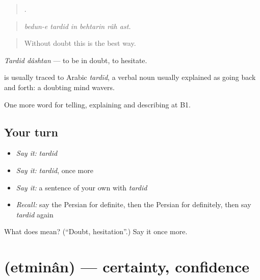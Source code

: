 \begin{quote}
     .
\end{quote}

\begin{quote}
\emph{bedun-e tardid in behtarin râh ast.}
\end{quote}

\begin{quote}
Without doubt this is the best way.
\end{quote}

\emph{Tardid dâshtan} — to be in doubt, to hesitate.

\begin{cousinweb}
\textbf{} is usually traced to Arabic \emph{tardīd}, a verbal noun usually explained as going back and forth: a doubting mind wavers.
\end{cousinweb}

\begin{grammarlens}[title={What you've built}]
One more word for telling, explaining and describing at B1.
\end{grammarlens}

\subsection*{Your turn}
\begin{itemize}
\raggedright
  \item \emph{Say it:} \emph{tardid}
  \item \emph{Say it:} \emph{tardid}, once more
  \item \emph{Say it:} a sentence of your own with \emph{tardid}
  \item \emph{Recall:} say the Persian for definite, then the Persian for definitely, then say \emph{tardid} again
\end{itemize}

\begin{tcolorbox}[breakable,colback=teal!4,colframe=teal!35!black,title={Before you move on}]
What does  mean? (\textquotedblleft{}Doubt, hesitation\textquotedblright{}.) Say it once more.
\end{tcolorbox}
\section[\texorpdfstring{\fa{اطمینان} (etminân)}{اطمینان (etminân)}]{ (etminân) — certainty, confidence}

